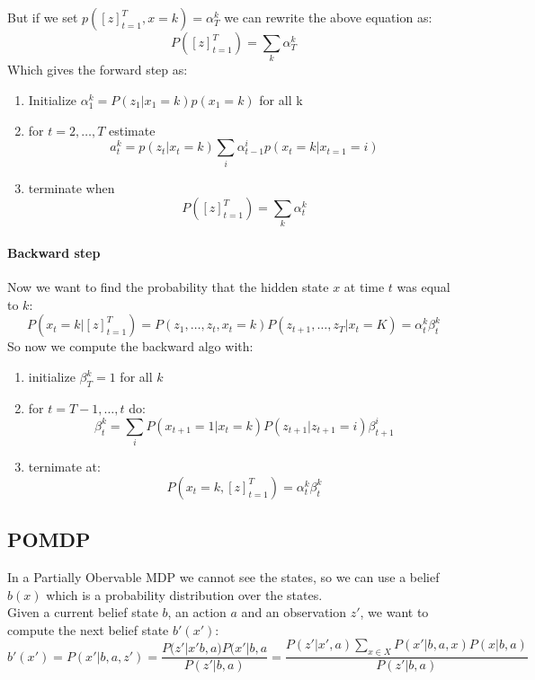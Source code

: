  But if we set  $p([z]_{t=1}^T,x=k)=\alpha_T^k$ we can rewrite the above equation as:
 $$P([z]_{t=1}^T)=\sum_k\alpha_T^k$$
 Which gives the forward step as:
 \begin{enumerate}
 \item Initialize $\alpha_1^k=P(z_1|x_1=k)p(x_1=k)$ for all k
 \item for $t=2,\dots,T$ estimate 
 $$a_t^k=p(z_t|x_t=k)\sum_i \alpha_{t-1}^ip(x_t=k|x_{t=1}=i)$$
 \item terminate when 
 $$P([z]_{t=1}^T)=\sum_k\alpha^k_t$$
  \end{enumerate}

 \paragraph{Backward step}
 Now we want to find the probability that the hidden state $x$ at time $t$ was equal to $k$:
 $$P(x_t=k|[z]_{t=1}^T)=P(z_1,\dots,z_t,x_t=k)P(z_{t+1},\dots,z_T|x_t=K)=\alpha^k_t\beta_t^k$$
 So now we compute the backward algo with:
 \begin{enumerate}
 \item initialize $\beta_T^k=1$ for all $k$
 \item for $t=T-1,\dots,t$ do:
 $$\beta_t^k=\sum_i P(x_{t+1}=1|x_t=k)P(z_{t+1}|z_{t+1}=i)\beta^i_{t+1}$$
 \item ternimate at:
 $$P(x_t=k,[z]_{t=1}^T)=\alpha^k_t\beta^k_t$$
 \end{enumerate}
 
 \subsection{POMDP}
 In a Partially Obervable MDP we cannot see the states, so we can use a belief $b(x)$ which is a probability distribution over the states.\\
 Given a current belief state $b$, an action $a$ and an observation $z'$, we want to compute the next belief state $b'(x')$:
 $$b'(x')=P(x'|b,a,z')=\frac{P(z'|x'b,a)P(x'|b,a}{P(z'|b,a)}=\frac{P(z'|x',a)\sum_{x\in X}P(x'|b,a,x)P(x|b,a)}{P(z'|b,a)}$$
 

 